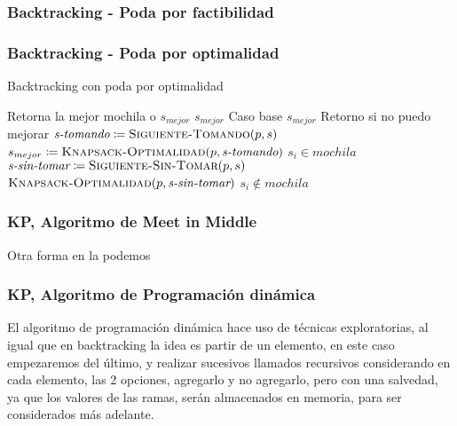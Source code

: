 \documentclass[fleqn, 11pt]{article}
\def\is{\coloneqq}
\begin{document}
\subsubsection{Backtracking - Poda por factibilidad}
\subsubsection{Backtracking - Poda por optimalidad}

\begin{algorithm}
\caption{Backtracking con poda por optimalidad}
\begin{algorithmic}[1]
\Comment Retorna la mejor mochila o $s_{mejor}$
	\State \Return $s_{mejor}$
	\Comment Caso base
\EndIf
{}
	\State \Return $s_{mejor}$
	\Comment Retorno si no puedo mejorar
\EndIf
{}
	\State $\textit{s-tomando} \is \Call{Siguiente-Tomando}{p, s}$
	\State $s_{mejor} \is \Call{Knapsack-Optimalidad}{p, \textit{s-tomando}}$
	\Comment $s_i \in mochila$
\EndIf
\State $\textit{s-sin-tomar} \is \Call{Siguiente-Sin-Tomar}{p, s}$
\State \Return $\Call{Knapsack-Optimalidad}{p, \textit{s-sin-tomar}}$
\Comment $s_i \not\in mochila$
\EndFunction
\end{algorithmic}
\end{algorithm}
\clearpage

\subsubsection{\textbf{KP, Algoritmo de Meet in Middle}}

Otra forma en la podemos

\clearpage


\subsubsection{\textbf{KP, Algoritmo de Programación dinámica}}

El algoritmo de programación dinámica hace uso de técnicas exploratorias, al igual que en backtracking la idea es
partir de un elemento, en este caso empezaremos del último, y realizar sucesivos llamados recursivos considerando
en cada elemento, las 2 opciones, agregarlo y no agregarlo, pero con una salvedad, ya que los valores de las ramas,
serán almacenados en memoria, para ser considerados más adelante. \\
\end{document}
